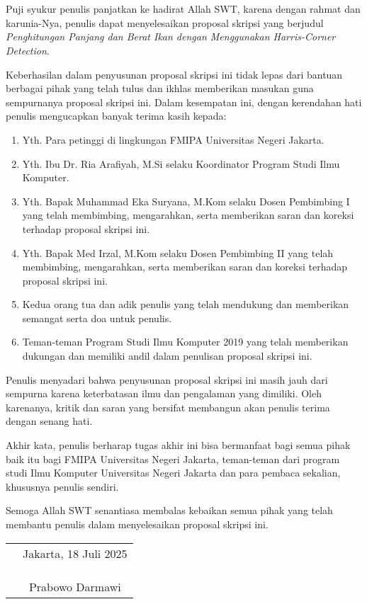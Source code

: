 \chapter*{}

Puji syukur penulis panjatkan ke hadirat Allah SWT, karena dengan rahmat dan
karunia-Nya, penulis dapat menyelesaikan proposal skripsi yang berjudul
\textit{Penghitungan Panjang dan Berat Ikan dengan Menggunakan Harris-Corner Detection}.

Keberhasilan dalam penyusunan proposal skripsi ini tidak lepas dari bantuan
berbagai pihak yang telah tulus dan ikhlas memberikan masukan guna sempurnanya proposal skripsi ini. Dalam kesempatan ini, dengan
kerendahan hati penulis mengucapkan banyak terima kasih kepada:

\begin{enumerate}

	\item{Yth. Para petinggi di lingkungan FMIPA Universitas Negeri Jakarta.}
	\item{Yth. Ibu Dr. Ria Arafiyah, M.Si selaku Koordinator Program Studi Ilmu
		Komputer.}
	\item{Yth. Bapak Muhammad Eka Suryana, M.Kom selaku Dosen Pembimbing I yang
		telah membimbing, mengarahkan, serta memberikan saran dan koreksi terhadap
		proposal skripsi ini.}
	\item{Yth. Bapak Med Irzal, M.Kom selaku Dosen Pembimbing II yang telah
		membimbing, mengarahkan, serta memberikan saran dan koreksi terhadap
		proposal skripsi ini.}
	\item{Kedua orang tua dan adik penulis yang telah mendukung dan memberikan 
		semangat serta doa untuk penulis.}
	\item{Teman-teman Program Studi Ilmu Komputer 2019 yang telah memberikan 
		dukungan dan memiliki andil dalam penulisan proposal skripsi ini.}
	
\end{enumerate}

Penulis menyadari bahwa penyusunan proposal skripsi ini masih jauh dari sempurna
karena keterbatasan ilmu dan pengalaman yang dimiliki. Oleh karenanya, kritik
dan saran yang bersifat membangun akan penulis terima dengan senang hati. 

Akhir kata, penulis berharap tugas akhir ini bisa bermanfaat bagi semua pihak baik itu bagi FMIPA Universitas Negeri Jakarta, teman-teman dari program studi Ilmu
Komputer Universitas Negeri Jakarta dan para pembaca sekalian, khususnya penulis sendiri.

Semoga Allah SWT senantiasa membalas kebaikan semua pihak yang telah membantu penulis dalam menyelesaikan proposal skripsi ini.

\vspace{2cm}

\begin{tabular}{p{7.5cm}c}
	&Jakarta, 18 Juli 2025 \\
	&\\
	&\\
	&\\
	&Prabowo Darmawi
\end{tabular}
